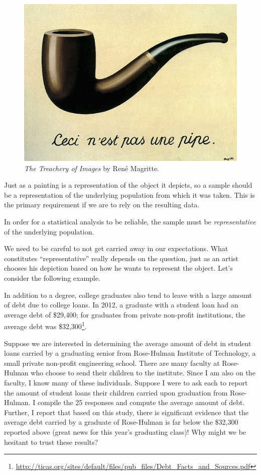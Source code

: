 \documentclass[]{book}
\let\rmarkdownfootnote\footnote%
\def\footnote{\protect\rmarkdownfootnote}
\theoremstyle{definition}
\theoremstyle{definition}
\theoremstyle{definition}
\theoremstyle{remark}
\let\BeginKnitrBlock\begin \let\EndKnitrBlock\end
\begin{document}
\begin{figure}

{\centering \includegraphics[width=0.8\linewidth]{./images/Data-Pipe} 

}

\caption{\emph{The Treachery of Images} by René
Magritte.}\label{fig:data-pipe-img}
\end{figure}

Just as a painting is a representation of the object it depicts, so a
sample should be a representation of the underlying population from
which it was taken. This is the primary requirement if we are to rely on
the resulting data.

\BeginKnitrBlock{rmdkeyidea}
In order for a statistical analysis to be reliable, the sample must be
\emph{representative} of the underlying population.
\EndKnitrBlock{rmdkeyidea}

We need to be careful to not get carried away in our expectations. What
constitutes ``representative'' really depends on the question, just as
an artist chooses his depiction based on how he wants to represent the
object. Let's consider the following example.

\BeginKnitrBlock{example}[School Debt]
\protect\hypertarget{exm:data-school-debt}{}{\label{exm:data-school-debt}
{} }In addition to a degree, college graduates
also tend to leave with a large amount of debt due to college loans. In
2012, a graduate with a student loan had an average debt of \$29,400;
for graduates from private non-profit institutions, the average debt was
\$32,300\footnote{\url{http://ticas.org/sites/default/files/pub_files/Debt_Facts_and_Sources.pdf}}.

Suppose we are interested in determining the average amount of debt in
student loans carried by a graduating senior from Rose-Hulman Institute
of Technology, a small private non-profit engineering school. There are
many faculty at Rose-Hulman who choose to send their children to the
institute. Since I am also on the faculty, I know many of these
individuals. Suppose I were to ask each to report the amount of student
loans their children carried upon graduation from Rose-Hulman. I compile
the 25 responses and compute the average amount of debt. Further, I
report that based on this study, there is significant evidence that the
average debt carried by a graduate of Rose-Hulman is far below the
\$32,300 reported above (great news for this year's graduating class)!
Why might we be hesitant to trust these results?
\EndKnitrBlock{example}
\end{document}
